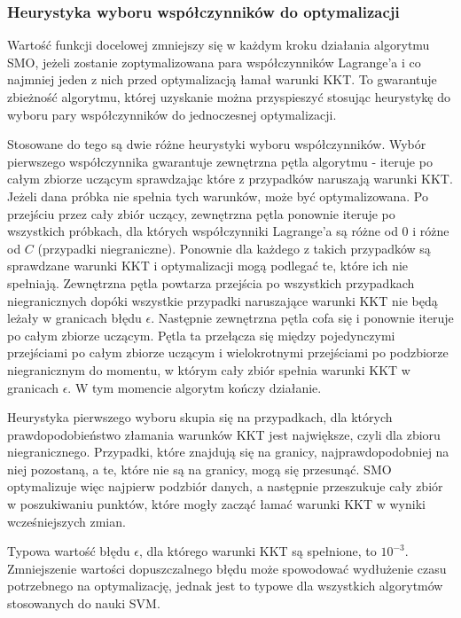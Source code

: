 \documentclass[[10pt,a4paper]{article}
\begin{document}
\subsubsection{Heurystyka wyboru współczynników do optymalizacji}


Wartość funkcji docelowej zmniejszy się w każdym kroku działania algorytmu SMO, jeżeli zostanie zoptymalizowana para współczynników Lagrange'a i co najmniej jeden z nich przed optymalizacją łamał warunki KKT. To gwarantuje zbieżność algorytmu, której uzyskanie można przyspieszyć stosując heurystykę do wyboru pary współczynników do jednoczesnej optymalizacji.


Stosowane do tego są dwie różne heurystyki wyboru współczynników. Wybór pierwszego współczynnika gwarantuje zewnętrzna pętla algorytmu - iteruje po całym zbiorze uczącym sprawdzając które z przypadków naruszają warunki KKT. Jeżeli dana próbka nie spełnia tych warunków, może być optymalizowana. Po przejściu przez cały zbiór uczący, zewnętrzna pętla ponownie iteruje po wszystkich próbkach, dla których współczynniki Lagrange'a są różne od 0 i różne od $C$ (przypadki niegraniczne). Ponownie dla każdego z takich przypadków są sprawdzane warunki KKT i optymalizacji mogą podlegać te, które ich nie spełniają. Zewnętrzna pętla powtarza przejścia po wszystkich przypadkach niegranicznych dopóki wszystkie przypadki naruszające warunki KKT nie będą leżały w granicach błędu $\epsilon$. Następnie zewnętrzna pętla cofa się i ponownie iteruje po całym zbiorze uczącym. Pętla ta przełącza się między pojedynczymi przejściami po całym zbiorze uczącym i wielokrotnymi przejściami po podzbiorze niegranicznym do momentu, w którym cały zbiór spełnia warunki KKT w granicach $\epsilon$. W tym momencie algorytm kończy działanie.


Heurystyka pierwszego wyboru skupia się na przypadkach, dla których prawdopodobieństwo złamania warunków KKT jest największe, czyli dla zbioru niegranicznego. Przypadki, które znajdują się na granicy, najprawdopodobniej na niej pozostaną, a te, które nie są na granicy, mogą się przesunąć. SMO optymalizuje więc najpierw podzbiór danych, a następnie przeszukuje cały zbiór w poszukiwaniu punktów, które mogły zacząć łamać warunki KKT w wyniki wcześniejszych zmian.


Typowa wartość błędu $\epsilon$, dla którego warunki KKT są spełnione, to $10^{-3}$. Zmniejszenie wartości dopuszczalnego błędu może spowodować wydłużenie czasu potrzebnego na optymalizację, jednak jest to typowe dla wszystkich algorytmów stosowanych do nauki SVM.
\end{document}
